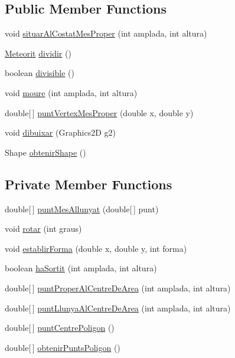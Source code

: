 \subsection*{Public Member Functions}
\begin{DoxyCompactItemize}
\item 
void \hyperlink{class_meteorit_ab1e8e957f4ba216253d211523f2b3091}{situar\+Al\+Costat\+Mes\+Proper} (int amplada, int altura)
\item 
\hyperlink{class_meteorit}{Meteorit} \hyperlink{class_meteorit_aa4b891941b6ef30774a45d6965266170}{dividir} ()
\item 
boolean \hyperlink{class_meteorit_ab7f4539dc26a5026d8978918620db253}{divisible} ()
\item 
void \hyperlink{class_meteorit_af23ae6e1b16f750542711547cbe4957c}{moure} (int amplada, int altura)
\item 
double\mbox{[}$\,$\mbox{]} \hyperlink{class_meteorit_a685d6a89435a2fb03f1d8ebdeb70cb14}{punt\+Vertex\+Mes\+Proper} (double x, double y)
\item 
void \hyperlink{class_meteorit_a28f9530c5db8c8a192b272b8bd1114d2}{dibuixar} (Graphics2\+D g2)
\item 
Shape \hyperlink{class_meteorit_a31192464dbdc8e1bac9ae57c87ac6e2b}{obtenir\+Shape} ()
\end{DoxyCompactItemize}
\subsection*{Private Member Functions}
\begin{DoxyCompactItemize}
\item 
double\mbox{[}$\,$\mbox{]} \hyperlink{class_meteorit_a353fa1242e850f582f792605167e58e7}{punt\+Mes\+Allunyat} (double\mbox{[}$\,$\mbox{]} punt)
\item 
void \hyperlink{class_meteorit_a429daccf37f941ac0395a1838f0991a2}{rotar} (int graus)
\item 
void \hyperlink{class_meteorit_a0bc8468013d85caed1efe51b98397069}{establir\+Forma} (double x, double y, int forma)
\item 
boolean \hyperlink{class_meteorit_ac447d4590c8de8fd6153402a512adee2}{ha\+Sortit} (int amplada, int altura)
\item 
double\mbox{[}$\,$\mbox{]} \hyperlink{class_meteorit_ab63300b6281833f51f228bf8fb49c035}{punt\+Proper\+Al\+Centre\+De\+Area} (int amplada, int altura)
\item 
double\mbox{[}$\,$\mbox{]} \hyperlink{class_meteorit_aec4418bf83baf51641639ef97407b03f}{punt\+Llunya\+Al\+Centre\+De\+Area} (int amplada, int altura)
\item 
double\mbox{[}$\,$\mbox{]} \hyperlink{class_meteorit_a8d316ea738e82c4c9b2e02bc787e8bdc}{punt\+Centre\+Poligon} ()
\item 
double\mbox{[}$\,$\mbox{]} \hyperlink{class_meteorit_a237af5bb28238c5e76d1cea55b4457b6}{obtenir\+Punts\+Poligon} ()
\end{DoxyCompactItemize}
